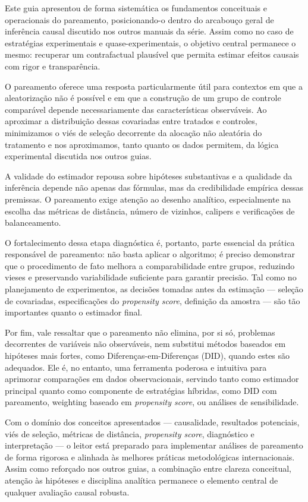 Este guia apresentou de forma sistemática os fundamentos conceituais e operacionais do pareamento, posicionando-o dentro do arcabouço geral de inferência causal discutido nos outros manuais da série. Assim como no caso de estratégias experimentais e quase-experimentais, o objetivo central permanece o mesmo: recuperar um contrafactual plausível que permita estimar efeitos causais com rigor e transparência.

O pareamento oferece uma resposta particularmente útil para contextos em que a aleatorização não é possível e em que a construção de um grupo de controle comparável depende necessariamente das características observáveis. Ao aproximar a distribuição dessas covariadas entre tratados e controles, minimizamos o viés de seleção decorrente da alocação não aleatória do tratamento e nos aproximamos, tanto quanto os dados permitem, da lógica experimental discutida nos outros guias.

A validade do estimador repousa sobre hipóteses substantivas e a qualidade da inferência depende não apenas das fórmulas, mas da credibilidade empírica dessas premissas. O pareamento exige atenção ao desenho analítico, especialmente na escolha das métricas de distância, número de vizinhos, calipers e verificações de balanceamento.

O fortalecimento dessa etapa diagnóstica é, portanto, parte essencial da prática responsável de pareamento: não basta aplicar o algoritmo; é preciso demonstrar que o procedimento de fato melhora a comparabilidade entre grupos, reduzindo vieses e preservando variabilidade suficiente para garantir precisão. Tal como no planejamento de experimentos, as decisões tomadas antes da estimação — seleção de covariadas, especificações do \textit{propensity score}, definição da amostra — são tão importantes quanto o estimador final.

Por fim, vale ressaltar que o pareamento não elimina, por si só, problemas decorrentes de variáveis não observáveis, nem substitui métodos baseados em hipóteses mais fortes, como Diferenças-em-Diferenças (DID), quando estes são adequados. Ele é, no entanto, uma ferramenta poderosa e intuitiva para aprimorar comparações em dados observacionais, servindo tanto como estimador principal quanto como componente de estratégias híbridas, como DID com pareamento, weighting baseado em \textit{propensity score}, ou análises de sensibilidade.

Com o domínio dos conceitos apresentados — causalidade, resultados potenciais, viés de seleção, métricas de distância, \textit{propensity score}, diagnóstico e interpretação — o leitor está preparado para implementar análises de pareamento de forma rigorosa e alinhada às melhores práticas metodológicas internacionais. Assim como reforçado nos outros guias, a combinação entre clareza conceitual, atenção às hipóteses e disciplina analítica permanece o elemento central de qualquer avaliação causal robusta.